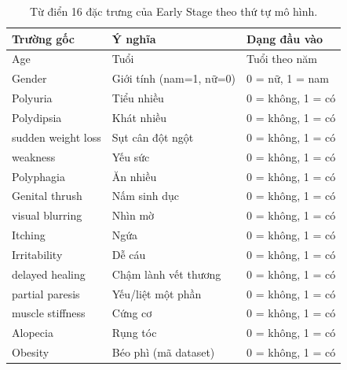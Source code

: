\par\FloatBarrier\begin{table}[H]\centering\small{}\setlength{\tabcolsep}{5pt}
\caption{Từ điển 16 đặc trưng của Early Stage theo thứ tự mô hình.}\begin{tabular}{P{5.2cm}P{5.3cm}P{4.0cm}}\toprule
Trường gốc & Ý nghĩa & Dạng đầu vào\\\midrule
Age & Tuổi & Tuổi theo năm\\
Gender & Giới tính (nam=1, nữ=0) & 0 = nữ, 1 = nam\\
Polyuria & Tiểu nhiều & 0 = không, 1 = có\\
Polydipsia & Khát nhiều & 0 = không, 1 = có\\
sudden weight loss & Sụt cân đột ngột & 0 = không, 1 = có\\
weakness & Yếu sức & 0 = không, 1 = có\\
Polyphagia & Ăn nhiều & 0 = không, 1 = có\\
Genital thrush & Nấm sinh dục & 0 = không, 1 = có\\
visual blurring & Nhìn mờ & 0 = không, 1 = có\\
Itching & Ngứa & 0 = không, 1 = có\\
Irritability & Dễ cáu & 0 = không, 1 = có\\
delayed healing & Chậm lành vết thương & 0 = không, 1 = có\\
partial paresis & Yếu/liệt một phần & 0 = không, 1 = có\\
muscle stiffness & Cứng cơ & 0 = không, 1 = có\\
Alopecia & Rụng tóc & 0 = không, 1 = có\\
Obesity & Béo phì (mã dataset) & 0 = không, 1 = có\\\bottomrule\end{tabular}\end{table}
